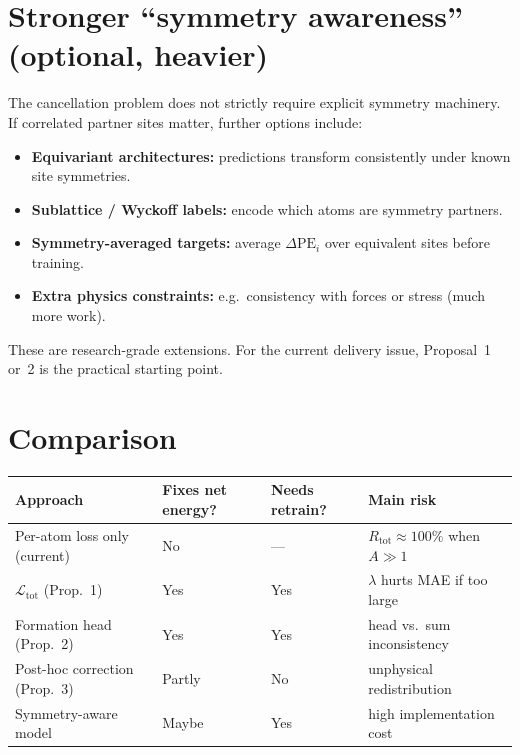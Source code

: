\documentclass[11pt,a4paper]{article}
\newcommand{\dPE}{\Delta\mathrm{PE}}
\begin{document}
\section*{Stronger ``symmetry awareness'' (optional, heavier)}

The cancellation problem does not strictly require explicit symmetry machinery. If correlated partner sites matter, further options include:

\begin{itemize}
  \item \textbf{Equivariant architectures:} predictions transform consistently under known site symmetries.
  \item \textbf{Sublattice / Wyckoff labels:} encode which atoms are symmetry partners.
  \item \textbf{Symmetry-averaged targets:} average $\dPE_i$ over equivalent sites before training.
  \item \textbf{Extra physics constraints:} e.g.\ consistency with forces or stress (much more work).
\end{itemize}

These are research-grade extensions. For the current delivery issue, Proposal~1 or~2 is the practical starting point.

\section*{Comparison}

\begin{center}
\small
\begin{tabular}{@{}>{\raggedright\arraybackslash}p{3.2cm} >{\raggedright\arraybackslash}p{4.2cm} >{\raggedright\arraybackslash}p{4.2cm} >{\raggedright\arraybackslash}p{3.8cm}@{}}
  \toprule
  Approach & Fixes net energy? & Needs retrain? & Main risk \\
  \midrule
  Per-atom loss only (current) & No & --- & $R_{\mathrm{tot}}\approx 100\%$ when $A\gg 1$ \\
  $\mathcal{L}_{\mathrm{tot}}$ (Prop.~1) & Yes & Yes & $\lambda$ hurts MAE if too large \\
  Formation head (Prop.~2) & Yes & Yes & head vs.\ sum inconsistency \\
  Post-hoc correction (Prop.~3) & Partly & No & unphysical redistribution \\
  Symmetry-aware model & Maybe & Yes & high implementation cost \\
  \bottomrule
\end{tabular}
\end{center}
\end{document}

